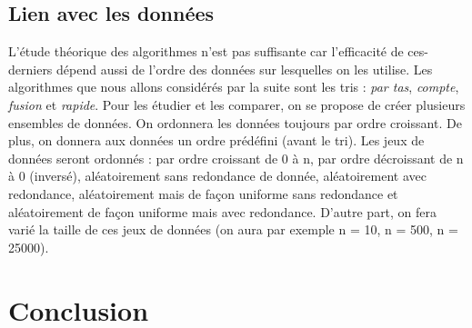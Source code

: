 \documentclass[11pt,a4paper]{article}
\begin{document}
\subsection{Lien avec les données}
L’étude théorique des algorithmes n’est pas suffisante car l’efficacité de ces-derniers dépend
aussi de l’ordre des données sur lesquelles on les utilise. Les algorithmes que nous allons considérés
par la suite sont les tris : \textit{par tas}, \textit{compte}, \textit{fusion} et \textit{rapide}. Pour les étudier et les
comparer, on se propose de créer plusieurs ensembles de données.
On ordonnera les données toujours par ordre croissant. De plus, on donnera aux données un
ordre prédéfini (avant le tri). Les jeux de données seront ordonnés : par ordre croissant de 0 à n,
par ordre décroissant de n à 0 (inversé), aléatoirement sans redondance de donnée, aléatoirement
avec redondance, aléatoirement mais de façon uniforme sans redondance et aléatoirement de façon
uniforme mais avec redondance. D’autre part, on fera varié la taille de ces jeux de données (on
aura par exemple n = 10, n = 500, n = 25000).

\section{Conclusion}
\end{document}
